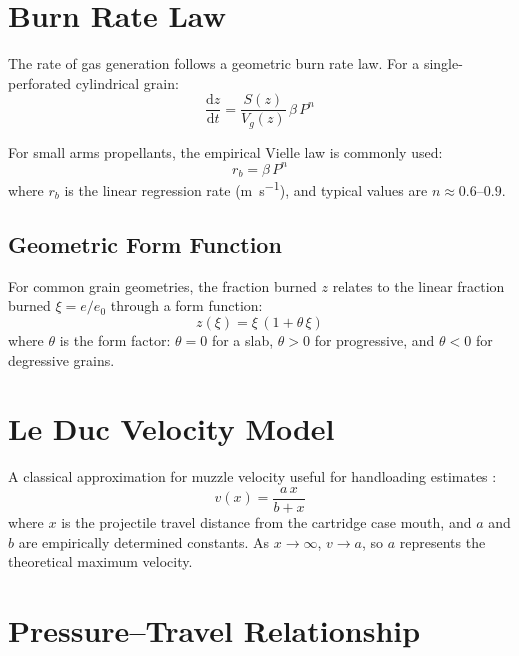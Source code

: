 \documentclass[11pt,twoside,openright]{report}
\newcommand{\dd}{\mathrm{d}}
\begin{document}
\section{Burn Rate Law}

The rate of gas generation follows a geometric burn rate law. For a single-perforated cylindrical grain:
\begin{equation}
  \frac{\dd z}{\dd t} = \frac{S(z)}{V_g(z)}\,\beta\,P^n
  \label{eq:burn_rate}
\end{equation}

For small arms propellants, the empirical Vielle law is commonly used:
\begin{equation}
  r_b = \beta\,P^n
  \label{eq:vielle}
\end{equation}
where $r_b$ is the linear regression rate (\si{\meter\per\second}), and typical values are $n \approx 0.6$--$0.9$.

\subsection{Geometric Form Function}

For common grain geometries, the fraction burned $z$ relates to the linear fraction burned $\xi = e/e_0$ through a form function:
\begin{equation}
  z(\xi) = \xi\,(1 + \theta\,\xi)
  \label{eq:form_function}
\end{equation}
where $\theta$ is the form factor: $\theta = 0$ for a slab, $\theta > 0$ for progressive, and $\theta < 0$ for degressive grains.

\section{Le Duc Velocity Model}

A classical approximation for muzzle velocity useful for handloading estimates \citep{mccoy1999modern}:
\begin{equation}
  v(x) = \frac{a\,x}{b + x}
  \label{eq:leduc}
\end{equation}
where $x$ is the projectile travel distance from the cartridge case mouth, and $a$ and $b$ are empirically determined constants. As $x \to \infty$, $v \to a$, so $a$ represents the theoretical maximum velocity.

\section{Pressure--Travel Relationship}
\end{document}
